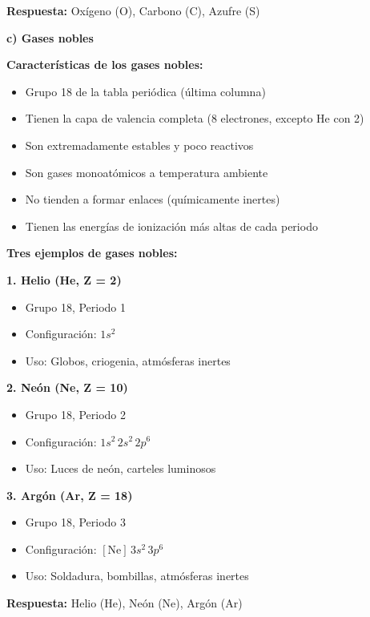 \begin{exercise}
\begin{solu}
        \textbf{Respuesta:} Oxígeno (O), Carbono (C), Azufre (S)

        \textbf{c) Gases nobles}

        \textbf{Características de los gases nobles:}
        \begin{itemize}
            \item Grupo 18 de la tabla periódica (última columna)
            \item Tienen la capa de valencia completa (8 electrones, excepto He con 2)
            \item Son extremadamente estables y poco reactivos
            \item Son gases monoatómicos a temperatura ambiente
            \item No tienden a formar enlaces (químicamente inertes)
            \item Tienen las energías de ionización más altas de cada periodo
        \end{itemize}

        \textbf{Tres ejemplos de gases nobles:}

        \textbf{1. Helio (He, Z = 2)}
        \begin{itemize}
            \item Grupo 18, Periodo 1
            \item Configuración: \(1s^2\)
            \item Uso: Globos, criogenia, atmósferas inertes
        \end{itemize}

        \textbf{2. Neón (Ne, Z = 10)}
        \begin{itemize}
            \item Grupo 18, Periodo 2
            \item Configuración: \(1s^2 \, 2s^2 \, 2p^6\)
            \item Uso: Luces de neón, carteles luminosos
        \end{itemize}

        \textbf{3. Argón (Ar, Z = 18)}
        \begin{itemize}
            \item Grupo 18, Periodo 3
            \item Configuración: \([\text{Ne}] \, 3s^2 \, 3p^6\)
            \item Uso: Soldadura, bombillas, atmósferas inertes
        \end{itemize}

        \textbf{Respuesta:} Helio (He), Neón (Ne), Argón (Ar)


\end{solu}
\end{exercise}
